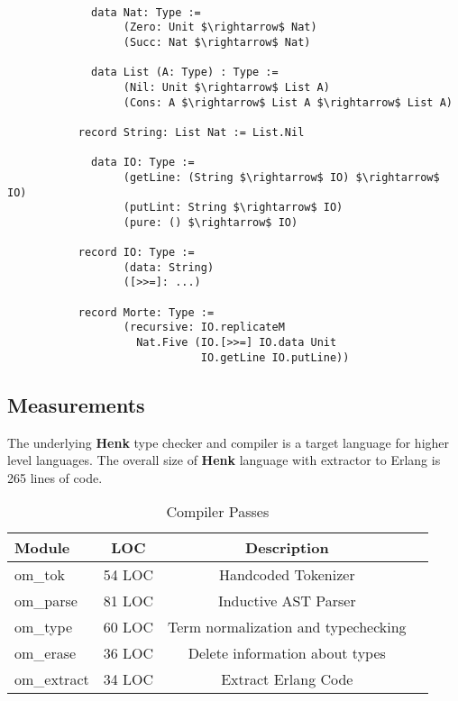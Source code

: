 \documentclass{article}
\begin{document}
\begin{lstlisting}[mathescape=true]

             data Nat: Type :=
                  (Zero: Unit $\rightarrow$ Nat)
                  (Succ: Nat $\rightarrow$ Nat)

             data List (A: Type) : Type :=
                  (Nil: Unit $\rightarrow$ List A)
                  (Cons: A $\rightarrow$ List A $\rightarrow$ List A)

           record String: List Nat := List.Nil

             data IO: Type :=
                  (getLine: (String $\rightarrow$ IO) $\rightarrow$ IO)
                  (putLint: String $\rightarrow$ IO)
                  (pure: () $\rightarrow$ IO)

           record IO: Type :=
                  (data: String)
                  ([>>=]: ...)

           record Morte: Type :=
                  (recursive: IO.replicateM
                    Nat.Five (IO.[>>=] IO.data Unit
                              IO.getLine IO.putLine))

\end{lstlisting}

\subsection{Measurements}
The underlying {\bf Henk} type checker and compiler is a target language for higher level languages.
The overall size of {\bf Henk} language with extractor to Erlang is 265 lines of code.

\begin{table}[h]
\begin{center}
\caption{Compiler Passes}
\label{tab:passes}
\begin{tabular}{lccc}
\hline
{\bf Module} & {\bf LOC} & {\bf Description}\\
\hline
om\_tok     & 54 LOC & Handcoded Tokenizer\\
om\_parse   & 81 LOC & Inductive AST Parser\\
om\_type    & 60 LOC & Term normalization and typechecking\\
om\_erase   & 36 LOC & Delete information about types\\
om\_extract & 34 LOC & Extract Erlang Code\\
\hline
\end{tabular}
\end{center}
\end{table}
\end{document}
